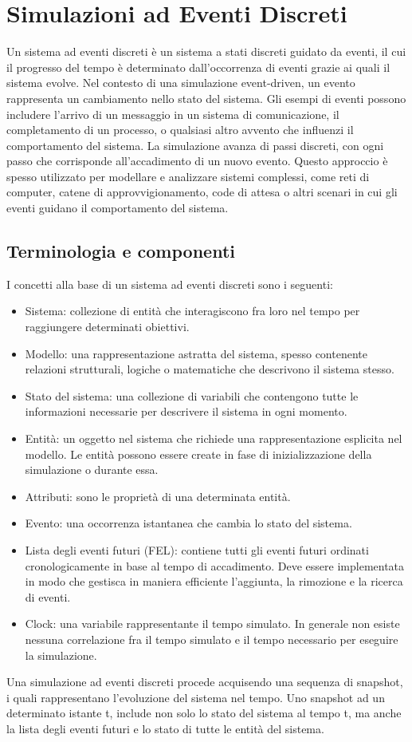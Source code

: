 \chapter{Simulazioni ad Eventi Discreti}
Un sistema ad eventi discreti è un sistema a stati discreti guidato da eventi, il cui il progresso del tempo è determinato dall'occorrenza di eventi grazie ai quali il sistema evolve. Nel contesto di una simulazione event-driven, un evento rappresenta un cambiamento nello stato del sistema. 
Gli esempi di eventi possono includere l'arrivo di un messaggio in un sistema di comunicazione, il completamento di un processo, o qualsiasi altro avvento che influenzi il comportamento del sistema. La simulazione avanza di passi discreti, con ogni passo che corrisponde all'accadimento di un nuovo evento. 
Questo approccio è spesso utilizzato per modellare e analizzare sistemi complessi, come reti di computer, catene di approvvigionamento, code di attesa o altri scenari in cui gli eventi guidano il comportamento del sistema. 

\section{Terminologia e componenti}
I concetti alla base di un sistema ad eventi discreti sono i seguenti: 
\begin{itemize}
    \item Sistema: collezione di entità che interagiscono fra loro nel tempo per raggiungere determinati obiettivi.
    \item Modello: una rappresentazione astratta del sistema, spesso contenente relazioni strutturali, logiche o matematiche che descrivono il sistema stesso.
    \item Stato del sistema: una collezione di variabili che contengono tutte le informazioni necessarie per descrivere il sistema in ogni momento.
    \item Entità: un oggetto nel sistema che richiede una rappresentazione esplicita nel modello. Le entità possono essere create in fase di inizializzazione della simulazione o durante essa. 
    \item Attributi: sono le proprietà di una determinata entità.
    \item Evento: una occorrenza istantanea che cambia lo stato del sistema. 
    \item Lista degli eventi futuri (FEL): contiene tutti gli eventi futuri ordinati cronologicamente in base al tempo di accadimento. Deve essere implementata in modo che gestisca in maniera efficiente l'aggiunta, la rimozione e la ricerca di eventi. 
    \item Clock: una variabile rappresentante il tempo simulato. In generale non esiste nessuna correlazione fra il tempo simulato e il tempo necessario per eseguire la simulazione. 
\end{itemize}
Una simulazione ad eventi discreti procede acquisendo una sequenza di snapshot, i quali rappresentano l'evoluzione del sistema nel tempo. Uno snapshot ad un determinato istante t, include non solo lo stato del sistema al tempo t, ma anche la lista degli eventi futuri e lo stato di tutte le entità del sistema.

